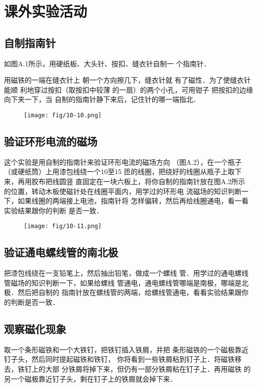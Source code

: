 \chapter{课外实验活动}

\section{自制指南针}
如图A.1所示，用硬纸板、大头针、按扣、缝衣针自制一
个指南针．

用磁铁的一端在缝衣针上
朝一个方向擦几下，缝衣针就
有了磁性．为了使缝衣针能顺
利地穿过按扣（取按扣中较薄
的一扇）的两个小孔，可用钳子
把按扣的边缘向下夹一下，当
自制的指南针静下来后，记住针的哪一端指北．

\begin{figure}[htp]\centering
    \texttt{[image: fig/10-10.png]}
    \caption{}
    \end{figure}


\section{验证环形电流的磁场}
这个实验是用自制的指南针来验证环形电流的磁场方向
（图A.2），在一个瓶子（或硬纸筒）上用漆包线绕一个10至15
匝的线圈，把绕好的线圈从瓶子上取下来，再用胶布把线圆竖
直固定在一块六板上，将你自制的指南针放在图A.2所示
的位置，转动木板使磁针处在线圈平面内，用学过的环形电
流磁场的知识判断一下，如果线圈的两端接上电池，指南针将
怎样偏转，然后再给线圈通电，看一看实验结果跟你的判断
是否一致．
\begin{figure}[htp]\centering
    \texttt{[image: fig/10-11.png]}
    \caption{}
    \end{figure}

    \section{验证通电螺线管的南北极}
把漆包线绕在一支铅笔上，然后抽出铅笔，做成一个螺线
管．用学过的通电螺线管磁场的知识判断一下，如果给螺线
管通电，通电螺线管哪端是南极，哪端是北极．然后把自制的
指南针放在螺线管的两端，给螺线管通电，看看实验结果跟你
的判断是否一致．

\section{观察磁化现象}
取一个条形磁铁和一个大铁钉，把铁钉插入铁屑，并把
条形磁铁的一个磁极靠近钉子头，然后同时提起磁铁和铁钉，
你将看到一些铁屑粘到钉子上．将磁铁移去，铁钉上的大部
分铁屑将掉下来，但仍有一部分铁屑粘在钉子上．再用磁铁
的另一个磁极靠近钉子头，剩在钉子上的铁屑就会掉下来．

